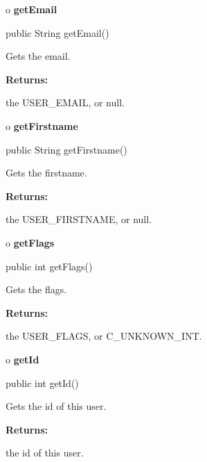 o {\bf getEmail} 

\begin{PRE}
 public String getEmail()
\end{PRE}

\begin{description}
\htmlDD Gets the email. 

\begin{description}
\item {\bf Returns:}  

the USER\_EMAIL, or null.  
\end{description}

\end{description}

o {\bf getFirstname} 

\begin{PRE}
 public String getFirstname()
\end{PRE}

\begin{description}
\htmlDD Gets the firstname. 

\begin{description}
\item {\bf Returns:}  

the USER\_FIRSTNAME, or null.  
\end{description}

\end{description}

o {\bf getFlags} 

\begin{PRE}
 public int getFlags()
\end{PRE}

\begin{description}
\htmlDD Gets the flags. 

\begin{description}
\item {\bf Returns:}  

the USER\_FLAGS, or C\_UNKNOWN\_INT.  
\end{description}

\end{description}

o {\bf getId} 

\begin{PRE}
 public int getId()
\end{PRE}

\begin{description}
\htmlDD Gets the id of this user. 

\begin{description}
\item {\bf Returns:}  

the id of this user.  
\end{description}

\end{description}

